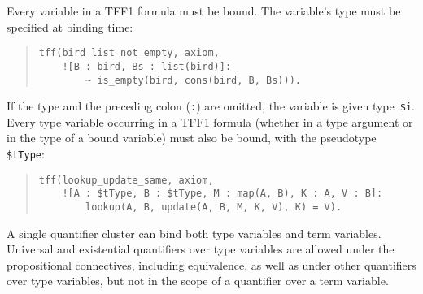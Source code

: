 Every variable in a TFF1 formula must be bound. The variable's type must be specified
at binding time:
\begin{quote}
\begin{verbatim}
tff(bird_list_not_empty, axiom,
    ![B : bird, Bs : list(bird)]:
        ~ is_empty(bird, cons(bird, B, Bs))).
\end{verbatim}
\end{quote}
If the type and the preceding colon ({\tt :}) are omitted, the variable is given
type~{\tt\$i}. Every type variable occurring in a TFF1 formula
(whether in a type argument or in the type of a bound variable)
must also be bound, with the pseudotype {\tt\$tType}:
\begin{quote}
\begin{verbatim}
tff(lookup_update_same, axiom,
    ![A : $tType, B : $tType, M : map(A, B), K : A, V : B]:
        lookup(A, B, update(A, B, M, K, V), K) = V).
\end{verbatim}
\end{quote}

\pagebreak[2] %

A single quantifier cluster can bind both type variables and term variables.
Universal and existential quantifiers over type variables are allowed under the
propositional connectives, including equivalence, as well as under other
quantifiers over type variables, but not in the scope of a quantifier over a
term variable.


